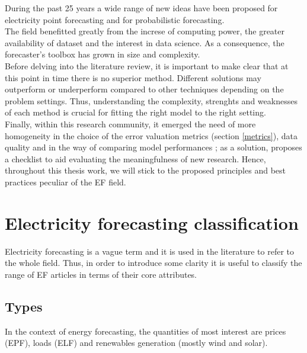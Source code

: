During the past 25 years %
a wide range of new ideas have been proposed for electricity point forecasting and for probabilistic forecasting.
\\
The field benefitted greatly from the increse of computing power, the greater availability of dataset and the interest in data science.
As a consequence, the forecaster's toolbox has grown in size and complexity.
\\
Before delving into the literature review, it is important to make clear that at this point in time there is no superior method. Different solutions may outperform or underperform compared to other techniques depending on the problem settings. Thus, understanding the complexity, strenghts and weaknesses of each method is crucial for fitting the right model to the right setting.
\\
Finally, within this research community, it emerged the need of more homogeneity in the choice of the error valuation metrics (section \ref{metrics}), data quality and in the way of comparing model performances \cite{EPF_review}; as a solution, \cite{lago} proposes a checklist to aid evaluating the meaningfulness of new research. Hence, throughout this thesis work, we will stick to the proposed principles and best practices peculiar of the EF field.

\section{Electricity forecasting classification}
Electricity forecasting is a vague term and it is used in the literature to refer to the whole field. Thus, in order to introduce some clarity it is useful to classify the range of EF articles in terms of their core attributes.
\subsection{Types}
In the context of energy forecasting, the quantities of most interest are prices (EPF), loads (ELF) and renewables generation (mostly wind and solar).

